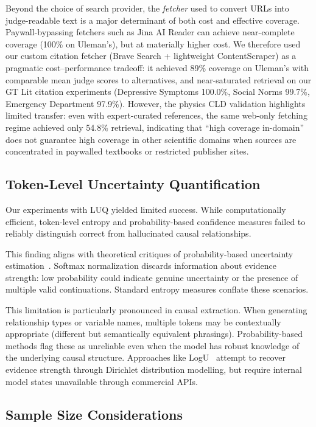 Beyond the choice of search provider, the \textit{fetcher} used to convert URLs into judge-readable text is a major determinant of both cost and effective coverage. Paywall-bypassing fetchers such as Jina AI Reader can achieve near-complete coverage (100\% on Uleman's), but at materially higher cost. We therefore used our custom citation fetcher (Brave Search + lightweight ContentScraper) as a pragmatic cost--performance tradeoff: it achieved 89\% coverage on Uleman's with comparable mean judge scores to alternatives, and near-saturated retrieval on our GT Lit citation experiments (Depressive Symptoms 100.0\%, Social Norms 99.7\%, Emergency Department 97.9\%). However, the physics CLD validation highlights limited transfer: even with expert-curated references, the same web-only fetching regime achieved only 54.8\% retrieval, indicating that ``high coverage in-domain'' does not guarantee high coverage in other scientific domains when sources are concentrated in paywalled textbooks or restricted publisher sites.

\subsection{Token-Level Uncertainty Quantification}

Our experiments with LUQ yielded limited success. While computationally efficient, token-level entropy and probability-based confidence measures failed to reliably distinguish correct from hallucinated causal relationships.

This finding aligns with theoretical critiques of probability-based uncertainty estimation~\citep{ma2025estimatingllmuncertainty}. Softmax normalization discards information about evidence strength: low probability could indicate genuine uncertainty or the presence of multiple valid continuations. Standard entropy measures conflate these scenarios.

This limitation is particularly pronounced in causal extraction. When generating relationship types or variable names, multiple tokens may be contextually appropriate (different but semantically equivalent phrasings). Probability-based methods flag these as unreliable even when the model has robust knowledge of the underlying causal structure. Approaches like LogU~\citep{ma2025estimatingllmuncertainty} attempt to recover evidence strength through Dirichlet distribution modelling, but require internal model states unavailable through commercial APIs.

\subsection{Sample Size Considerations}

